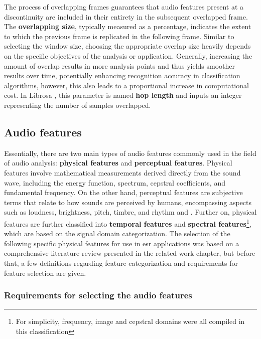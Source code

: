 The process of overlapping frames guarantees that audio features present at a discontinuity are included in their entirety in the subsequent overlapped frame. The \textbf{overlapping size}, typically measured as a percentage, indicates the extent to which the previous frame is replicated in the following frame. Similar to selecting the window size, choosing the appropriate overlap size heavily depends on the specific objectives of the analysis or application. Generally, increasing the amount of overlap results in more analysis points and thus yields smoother results over time, potentially enhancing recognition accuracy in classification algorithms, however, this also leads to a proportional increase in computational cost. In Librosa \cite{McFee2015librosa_sw}, this parameter is named \textbf{hop length} and inputs an integer representing the number of samples overlapped.


\subsection{Audio features}
\label{subsec:audio_fundamentals_audio_features}

Essentially, there are two main types of audio features commonly used in the field of audio analysis: \textbf{physical features} and \textbf{perceptual features}. Physical features involve mathematical measurements derived directly from the sound wave, including the energy function, spectrum, cepstral coefficients, and fundamental frequency. On the other hand, perceptual features are subjective terms that relate to how sounds are perceived by humans, encompassing aspects such as loudness, brightness, pitch, timbre, and rhythm \cite{Zhang2010} and \cite{Alias2016}. Further on, physical features are further classified into \textbf{temporal features} and \textbf{spectral features}\footnote{For simplicity, frequency, image and cepstral domains were all compiled in this classification}, which are based on the signal domain categorization. The selection of the following specific physical features for use in \gls{esr} applications was based on a comprehensive literature review presented in the related work chapter, but before that, a few definitions regarding feature categorization and requirements for feature selection are given.


\subsubsection{Requirements for selecting the audio features}
\label{subsubsec:audio_features_requirements_for_selecting_features}


